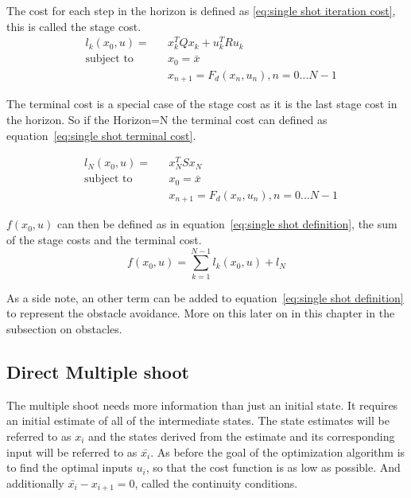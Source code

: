 			The cost for each step in the horizon is defined as \ref{eq:single shot iteration cost}, this is called the stage cost.
			\begin{equation}
				\begin{aligned}
				& l_k(x_0,u) = &&  x_k^T Q x_k  +  u_k^T R u_k \\
				& \text{subject to}			&& x_0 = \bar{x} \\
				& 							&&  x_{n+1} = F_d(x_n,u_n), n=0...N-1
				\end{aligned}
				\label{eq:single shot iteration cost}
			\end{equation}
			
			The terminal cost is a special case of the stage cost as it is the last stage cost in the horizon. So if the Horizon=N the terminal cost can defined as equation~\ref{eq:single shot terminal cost}.
			
			\begin{equation}
				\begin{aligned}
					& l_N(x_0,u) = && x_N^TSx_N \\
					& \text{subject to}			&& x_0 = \bar{x} \\
					& 							&&  x_{n+1} = F_d(x_n,u_n), n=0...N-1
				\end{aligned}
				\label{eq:single shot terminal cost}
			\end{equation}
			
			$f(x_0,u)$ can then be defined as in equation~\ref{eq:single shot definition}, the sum of the stage costs and the terminal cost.
			\begin{equation}
				f(x_0,u) = \sum_{k=1}^{N-1} l_k(x_0,u) + l_N
				\label{eq:single shot definition}
			\end{equation}
			
			As a side note, an other term can be added to equation~\ref{eq:single shot definition} to represent the obstacle avoidance. More on this later on in this chapter in the subsection on obstacles.
		\subsection{Direct Multiple shoot}
			The multiple shoot needs more information than just an initial state. It requires an initial estimate of all of the intermediate states. The state estimates will be referred to as $x_i$ and the states derived from the estimate and its corresponding input will be referred to as $\bar{x_i}$. As before the goal of the optimization algorithm is to find the optimal inputs $u_i$, so that the cost function is as low as possible. And additionally  $\bar{x_i} - x_{i+1} = 0$, called the continuity conditions.
			
